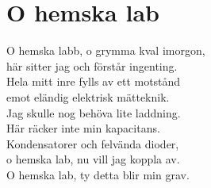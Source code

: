 \section{O hemska lab}
O hemska labb, o grymma kval imorgon,\\
här sitter jag och förstår ingenting.\\
Hela mitt inre fylls av ett motstånd\\
emot eländig elektrisk mätteknik.\\

Jag skulle nog behöva lite laddning.\\
Här räcker inte min kapacitans.\\

Kondensatorer och felvända dioder,\\
o hemska lab, nu vill jag koppla av.\\
O hemska lab, ty detta blir min grav.\\
